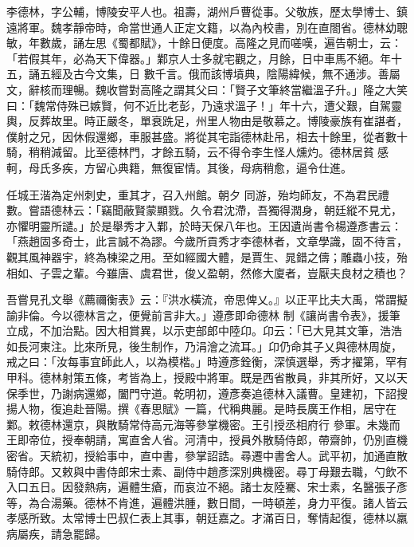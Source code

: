 
\begin{pinyinscope}

 李德林，字公輔，博陵安平人也。祖壽，湖州戶曹從事。父敬族，歷太學博士、鎮遠將軍。魏孝靜帝時，命當世通人正定文籍，以為內校書，別在直閤省。德林幼聰敏，年數歲，誦左思《蜀都賦》，十餘日便度。高隆之見而嗟嘆，遍告朝士，云：「若假其年，必為天下偉器。」鄴京人士多就宅觀之，月餘，日中車馬不絕。年十五，誦五經及古今文集，日
 數千言。俄而該博墳典，陰陽緯候，無不通涉。善屬文，辭核而理暢。魏收嘗對高隆之謂其父曰：「賢子文筆終當繼溫子升。」隆之大笑曰：「魏常侍殊已嫉賢，何不近比老彭，乃遠求溫子！」年十六，遭父艱，自駕靈輿，反葬故里。時正嚴冬，單衰跣足，州里人物由是敬慕之。博陵豪族有崔諶者，僕射之兄，因休假還鄉，車服甚盛。將從其宅詣德林赴吊，相去十餘里，從者數十騎，稍稍減留。比至德林門，才餘五騎，云不得令李生怪人燻灼。德林居貧感軻，母氏多疾，方留心典籍，無復宦情。其後，母病稍愈，逼令仕進。



 任城王湝為定州刺史，重其才，召入州館。朝夕
 同游，殆均師友，不為君民禮數。嘗語德林云：「竊聞蔽賢蒙顯戮。久令君沈滯，吾獨得潤身，朝廷縱不見尤，亦懼明靈所譴。」於是舉秀才入鄴，於時天保八年也。王因遺尚書令楊遵彥書云：「燕趙固多奇士，此言誠不為謬。今歲所貢秀才李德林者，文章學識，固不待言，觀其風神器宇，終為棟梁之用。至如經國大體，是賈生、晁錯之儔；雕蟲小技，殆相如、子雲之輩。今雖唐、虞君世，俊乂盈朝，然修大廈者，豈厭夫良材之積也？



 吾嘗見孔文舉《薦禰衡表》云：『洪水橫流，帝思俾乂。』以正平比夫大禹，常謂擬諭非倫。今以德林言之，便覺前言非大。」遵彥即命德林
 制《讓尚書令表》，援筆立成，不加治點。因大相賞異，以示吏部郎中陸卬。卬云：「已大見其文筆，浩浩如長河東注。比來所見，後生制作，乃涓澮之流耳。」卬仍命其子乂與德林周旋，戒之曰：「汝每事宜師此人，以為模楷。」時遵彥銓衡，深慎選舉，秀才擢第，罕有甲科。德林射策五條，考皆為上，授殿中將軍。既是西省散員，非其所好，又以天保季世，乃謝病還鄉，闔門守道。乾明初，遵彥奏追德林入議曹。皇建初，下詔搜揚人物，復追赴晉陽。撰《春思賦》一篇，代稱典麗。是時長廣王作相，居守在鄴。敕德林還京，與散騎常侍高元海等參掌機密。王引授丞相府行
 參軍。未幾而王即帝位，授奉朝請，寓直舍人省。河清中，授員外散騎侍郎，帶齋帥，仍別直機密省。天統初，授給事中，直中書，參掌詔誥。尋遷中書舍人。武平初，加通直散騎侍郎。又敕與中書侍郎宋士素、副侍中趙彥深別典機密。尋丁母艱去職，勺飲不入口五日。因發熱病，遍體生瘡，而哀泣不絕。諸士友陸騫、宋士素，名醫張子彥等，為合湯藥。德林不肯進，遍體洪腫，數日間，一時頓差，身力平復。諸人皆云孝感所致。太常博士巴叔仁表上其事，朝廷嘉之。才滿百日，奪情起復，德林以羸病屬疾，請急罷歸。




\end{pinyinscope}
